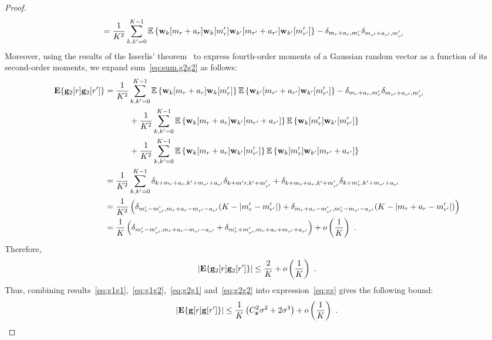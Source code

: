 \documentclass[journal,onecolumn]{IEEEtran}
\begin{document}
\begin{proof}
\begin{align}
&= \dfrac1{K^2}\sum_{k,k'=0}^{K-1} \EE\left\{\bw_{k}[m_{r}+a_{r}]\bw_{k}[m'_{r}]\bw_{k'}[m_{r'}+a_{r'}]\bw_{k'}[m'_{r'}]\right\} - \delta_{m_{r}+a_{r},m'_{r}}\delta_{m_{r'}+a_{r'},m'_{r'}}
\label{eq:sum.g2g2}
\end{align}
Moreover, using the results of the Isserlis' theorem~\cite{Isserlis16formula} to express fourth-order moments of a Gaussian random vector as a function of its second-order moments, we expand sum~\eqref{eq:sum.g2g2} as follows:
\begin{align*}
{\mathbf E}\{{\mathbf g}_2[r]{\mathbf g}_2[r']\} &= \dfrac1{K^2} \sum_{k,k'=0}^{K-1} {\mathbb E}\left\{{\mathbf w}_{k}[m_{r}+a_{r}]{\mathbf w}_{k}[m'_{r}]\right\}{\mathbb E}\left\{{\mathbf w}_{k'}[m_{r'}+a_{r'}]{\mathbf w}_{k'}[m'_{r'}]\right\} - \delta_{m_{r}+a_{r},m'_{r}}\delta_{m_{r'}+a_{r'},m'_{r'}} \\
&\hspace{30pt}+ \dfrac1{K^2}\sum_{k,k'=0}^{K-1}{\mathbb E}\left\{{\mathbf w}_{k}[m_{r}+a_{r}]{\mathbf w}_{k'}[m_{r'}+a_{r'}]\right\}{\mathbb E}\left\{{\mathbf w}_{k}[m'_{r}]{\mathbf w}_{k'}[m'_{r'}]\right\} \\
&\hspace{30pt}+ \dfrac1{K^2}\sum_{k,k'=0}^{K-1} {\mathbb E}\left\{{\mathbf w}_{k}[m_{r}+a_{r}]{\mathbf w}_{k'}[m'_{r'}]\right\}{\mathbb E}\left\{{\mathbf w}_{k}[m'_{r}]{\mathbf w}_{k'}[m_{r'}+a_{r'}]\right\} \\
& = \dfrac1{K^2}\sum_{k,k'=0}^{K-1} \delta_{k+m_r+a_r,k'+m_{r'}+a_{r'}}\delta_{k+m'r,k'+m'_{r'}} + \delta_{k+m_r+a_r,k'+m'_{r'}}\delta_{k+m'_r,k'+m_{r'}+a_{r'}} \\
& = \dfrac1{K^2}\left(\delta_{m'_r-m'_{r'},m_r+a_r-m_{r'}-a_{r'}}(K-|m'_r-m'_{r'}|) +  \delta_{m_r+a_r-m'_{r'},m'_r-m_{r'}-a_{r'}}(K-|m_r+a_r-m'_{r'}|)\right) \\
& = \dfrac1{K}\left(\delta_{m'_r-m'_{r'},m_r+a_r-m_{r'}-a_{r'}} + \delta_{m'_r+m'_{r'},m_r+a_r+m_{r'}+a_{r'}}\right) + o\left( \dfrac1K\right)\ .
\end{align*}
Therefore,
\begin{equation}
\left| \bE\{\bg_2[r]\bg_2[r']\} \right| \leq \dfrac2{K} + o\left( \dfrac1K\right)\ .
\label{eq:g2g2}
\end{equation}
Thus, combining results~\eqref{eq:g1g1},~\eqref{eq:g1g2},~\eqref{eq:g2g1} and~\eqref{eq:g2g2} into expression~\eqref{eq:gg} gives the following bound:
\begin{equation*}
\left|\bE\{\bg[r]\bg[r']\}\right| \leq \dfrac1K \left( C_\bz^2\sigma^2 + 2 \sigma^4\right) + o\left(\dfrac1K\right)\ .
\end{equation*}


\end{proof}
\end{document}
